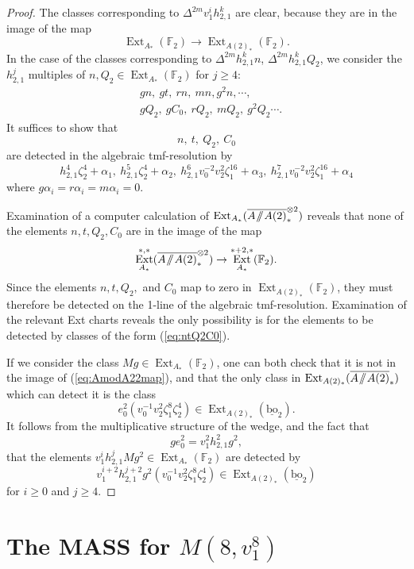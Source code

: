 \documentclass[10pt]{amsart}
\newcommand{\sslash}{\mathbin{/\mkern-6mu/}}
\newcommand{\mmod}{\! \sslash \!}
\newcommand{\ul}[1]{\underline{#1}}
\newcommand{\br}[1]{\overline{#1}}
\newcommand{\FF}{\mathbb{F}}
\newcommand{\bo}{\mathrm{bo}}
\newcommand{\bou}{\ul{\bo}}
\theoremstyle{definition}
\numberwithin{equation}{section}
\numberwithin{figure}{section}
\DeclareMathOperator{\Ext}{Ext}
\begin{document}
\begin{proof}
The classes corresponding to $\Delta^{2m} v_1^i h^k_{2,1}$ are clear, because they are in the image of the map
$$ \Ext_{A_*}(\FF_2) \rightarrow \Ext_{A(2)_*}(\FF_2). $$
In the case of the classes corresponding to $\Delta^{2m}h^k_{2,1} n$, $\Delta^{2m}h^k_{2,1} Q_2$,
we consider the $h^j_{2,1}$ multiples of $n, Q_2 \in \Ext_{A_*}(\FF_2)$ for $j \ge 4$:
 \begin{align*}
 & gn, \: gt, \: rn, \: mn, g^2 n, \cdots, \\
 & gQ_2, \: gC_0, \: rQ_2, \: mQ_2, \: g^2 Q_2 \cdots.
 \end{align*}
It suffices to show that 
$$ n,\: t, \: Q_2, \: C_0$$
are detected in the algebraic tmf-resolution by
\begin{equation}\label{eq:ntQ2C0}
 h_{2,1}^4\zeta_2^4 + \alpha_1, \: h^5_{2,1}\zeta_2^4+\alpha_2, \: h^6_{2,1}v_0^{-2}v_2^2\zeta_1^{16} + \alpha_3, \: h^{7}_{2,1} v_0^{-2}v_2^2\zeta_1^{16} + \alpha_4
\end{equation}
where $g\alpha_i = r\alpha_i = m\alpha_i = 0$.

Examination of a computer calculation of $\Ext_{A_*}(\br{A\mmod A(2)}^{\otimes 2}_*)$ reveals that none of the elements $n,t, Q_2, C_0$ are in the image of the map
\begin{equation}\label{eq:AmodA22map}
 \Ext^{*,*}_{A_*}(\br{A \mmod A(2)}^{\otimes 2}_*) \rightarrow \Ext^{*+2,*}_{A_*}(\FF_2). 
 \end{equation}
Since the elements $n, t, Q_2,$ and $C_0$ map to zero in $\Ext_{A(2)_*}(\FF_2)$, they must therefore be detected on the 1-line of the algebraic tmf-resolution.  Examination of the relevant Ext charts reveals the only possibility is for the elements to be detected by classes of the form (\ref{eq:ntQ2C0}).

If we consider the class $Mg \in \Ext_{A_*}(\FF_2)$, one can both check that it is not in the image of (\ref{eq:AmodA22map}), and that the only class in $\Ext_{A(2)_*}(\br{A \mmod A(2)}_*)$ which can detect it is the class 
$$ e_0^2(v_0^{-1}v_2^2\zeta_1^8\zeta_2^4) \in \Ext_{A(2)_*}(\bou_2). $$ 
It follows from the multiplicative structure of the wedge, and the fact that
$$ g e_0^2 = v_1^2 h^2_{2,1}g^2, $$
that the elements $v_1^i h^j_{2,1}Mg^2 \in \Ext_{A_*}(\FF_2)$ are detected by 
$$ v_1^{i+2} h^{j+2}_{2,1} g^2(v_0^{-1}v_2^2\zeta_1^8\zeta_2^4) \in \Ext_{A(2)_*}(\bou_2) $$ 
for $i \ge 0$ and $j \ge 4$.
\end{proof}

\section{The MASS for $M(8,v_1^8)$}\label{sec:M38}
\end{document}

